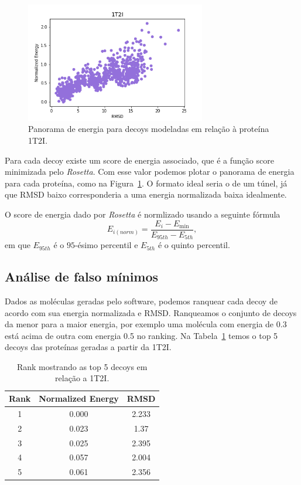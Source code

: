\begin{figure}[!htbp]
    \centering
    \includegraphics[width=0.7\textwidth]{images/relatorio/1t2i_tunnel.png}
    \caption{Panorama de energia para decoys modeladas em relação à proteína 1T2I.}
    \label{fig:1t2iland}
    \fautor
\end{figure}

Para cada decoy existe um score de energia associado, que é a função score minimizada pelo \textit{Rosetta}.
Com esse valor podemos plotar o panorama de energia para cada proteína, como na Figura~\ref{fig:1t2iland}.
O formato ideal seria o de um túnel, já que RMSD baixo corresponderia a uma energia normalizada baixa idealmente.

O score de energia dado por \textit{Rosetta} é normlizado usando a seguinte fórmula
\begin{equation}
    E_{i(norm)} = \frac{E_i - E_{\min}}{E_{95th} - E_{5th}},
\end{equation}
em que $E_{95th}$ é o $95$-ésimo percentil e $E_{5th}$ é o quinto percentil.

\subsection{Análise de falso mínimos}
Dados as moléculas geradas pelo software, podemos ranquear cada decoy de acordo com sua energia normalizada
e RMSD. Ranqueamos o conjunto de decoys da menor para a maior energia, por exemplo uma molécula com energia
de 0.3 está acima de outra com energia 0.5 no ranking. Na Tabela~\ref{tab:protrank} temos o top 5 decoys
das proteínas geradas a partir da 1T2I.

\begin{table}[!htbp]
    \centering
    \caption{Rank mostrando as top 5 decoys em relação a 1T2I.}
    \label{tab:protrank}
    \begin{tabular}{@{}ccc@{}}
        \toprule
        Rank & Normalized Energy & RMSD  \\
        \midrule
        1    & 0.000             & 2.233 \\
        2    & 0.023             & 1.37  \\
        3    & 0.025             & 2.395 \\
        4    & 0.057             & 2.004 \\
        5    & 0.061             & 2.356 \\
        \bottomrule
    \end{tabular}
\end{table}

